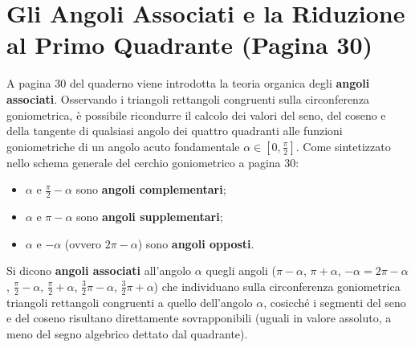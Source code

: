 \documentclass[11pt,a4paper,oneside]{report}
\begin{document}
\section{Gli Angoli Associati e la Riduzione al Primo Quadrante (Pagina 30)}
A pagina 30 del quaderno viene introdotta la teoria organica degli \textbf{angoli associati}.
Osservando i triangoli rettangoli congruenti sulla circonferenza goniometrica, è possibile ricondurre il calcolo dei valori del seno, del coseno e della tangente di qualsiasi angolo dei quattro quadranti alle funzioni goniometriche di un angolo acuto fondamentale $\alpha \in \left[0, \frac{\pi}{2}\right]$.
Come sintetizzato nello schema generale del cerchio goniometrico a pagina 30:
\begin{itemize}[leftmargin=*, label=\textbullet]
    \item $\alpha$ e $\frac{\pi}{2} - \alpha$ sono \textbf{angoli complementari};
    \item $\alpha$ e $\pi - \alpha$ sono \textbf{angoli supplementari};
    \item $\alpha$ e $-\alpha$ (ovvero $2\pi - \alpha$) sono \textbf{angoli opposti}.
\end{itemize}

\begin{definizione}
Si dicono \textbf{angoli associati} all'angolo $\alpha$ quegli angoli ($\pi - \alpha$, $\pi + \alpha$, $-\alpha = 2\pi - \alpha$, $\frac{\pi}{2} - \alpha$, $\frac{\pi}{2} + \alpha$, $\frac{3}{2}\pi - \alpha$, $\frac{3}{2}\pi + \alpha$) che individuano sulla circonferenza goniometrica triangoli rettangoli congruenti a quello dell'angolo $\alpha$, cosicché i segmenti del seno e del coseno risultano direttamente sovrapponibili (uguali in valore assoluto, a meno del segno algebrico dettato dal quadrante).
\end{definizione}
\end{document}
